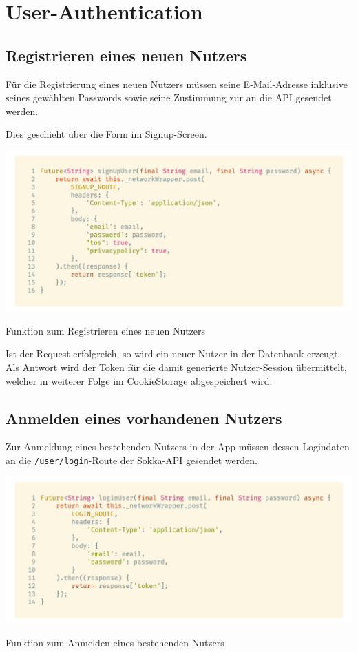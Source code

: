 \section{User-Authentication}

\subsection{Registrieren eines neuen Nutzers}

Für die Registrierung eines neuen Nutzers müssen seine E-Mail-Adresse inklusive seines 
gewählten Passwords sowie seine Zustimmung zur an die API gesendet werden. 

Dies geschieht über die Form im Signup-Screen.

\begin{code}
    \centering
    \includegraphics[width=1\textwidth]{images/Dart/services/user-auth/signup.png}
    \caption{Funktion zum Registrieren eines neuen Nutzers}
\end{code}

Ist der Request erfolgreich, so wird ein neuer Nutzer in der Datenbank erzeugt. Als Antwort wird der
Token für die damit generierte Nutzer-Session übermittelt, welcher in weiterer Folge im CookieStorage
abgespeichert wird.

\newpage

\subsection{Anmelden eines vorhandenen Nutzers}

Zur Anmeldung eines bestehenden Nutzers in der App müssen dessen Logindaten an die 
\lstinline{/user/login}-Route der Sokka-API gesendet werden.\\

\begin{code}
    \centering
    \includegraphics[width=1\textwidth]{images/Dart/services/user-auth/login.png}
    \caption{Funktion zum Anmelden eines bestehenden Nutzers}
\end{code}

